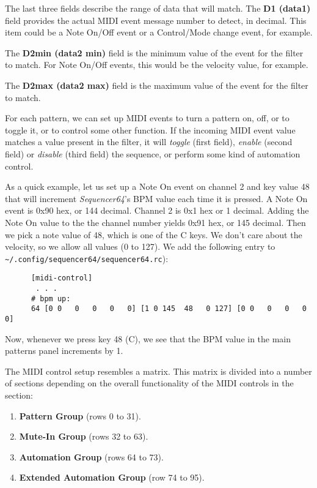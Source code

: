    The last three fields describe the range of data that will match.  The
   \textbf{D1 (data1)} field provides the actual MIDI event message number to
   detect, in decimal.  This item could be a Note On/Off event or a
   Control/Mode change event, for example.

   The \textbf{D2min (data2 min)} field is the minimum value of the event for
   the filter to match. For Note On/Off events, this would be the velocity
   value, for example.

   The \textbf{D2max (data2 max)} field is the maximum value of the event for
   the filter to match.


   For each pattern, we can set up MIDI events to turn a 
   pattern on, off, or to toggle it, or to control some other function.
   If the incoming MIDI event value matches a value present in the filter, it
   will \textsl{toggle} (first field), \textsl{enable} (second field) or
   \textsl{disable} (third field) the sequence, or perform some kind of automation
   control.

   As a quick example, let us set up a Note On event on channel 2 and key value
   48 that will increment \textsl{Sequencer64}'s BPM value each time it is
   pressed.  A Note On event is 0x90 hex, or 144 decimal.  Channel 2 is 0x1 hex
   or 1 decimal.   Adding the Note On value to the the channel number yields
   0x91 hex, or 145 decimal.  Then we pick a note value of 48, which is one of
   the C keys.  We don't care about the velocity, so we allow all values (0 to
   127).  We add the following entry to
   \texttt{\textasciitilde/.config/sequencer64/sequencer64.rc}):

   \begin{verbatim}
      [midi-control]
       . . .
      # bpm up:
      64 [0 0   0   0   0   0] [1 0 145  48   0 127] [0 0   0   0   0   0]
   \end{verbatim}

   Now, whenever we press key 48 (C), we see that the BPM value in the main
   patterns panel increments by 1.

   The MIDI control setup resembles a matrix.  This matrix is divided into a
   number of sections depending on the overall functionality of the MIDI
   controls in the section:

   \begin{enumerate}
      \item \textbf{Pattern Group} (rows 0 to 31).
      \item \textbf{Mute-In Group} (rows 32 to 63).
      \item \textbf{Automation Group} (rows 64 to 73).
      \item \textbf{Extended Automation Group} (row 74 to 95).
   \end{enumerate}

